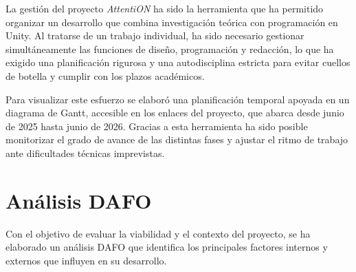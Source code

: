 \documentclass[12pt, a4paper]{report}
\begin{document}
La gestión del proyecto \textit{AttentiON} ha sido la herramienta que ha
permitido organizar un desarrollo que combina investigación teórica con
programación en Unity. Al tratarse de un trabajo individual, ha sido necesario
gestionar simultáneamente las funciones de diseño, programación y redacción,
lo que ha exigido una planificación rigurosa y una autodisciplina estricta
para evitar cuellos de botella y cumplir con los plazos académicos.

Para visualizar este esfuerzo se elaboró una planificación temporal apoyada
en un diagrama de Gantt, accesible en los enlaces del proyecto, que abarca
desde junio de 2025 hasta junio de 2026. Gracias a esta herramienta ha
sido posible monitorizar el grado de avance de las distintas fases y ajustar
el ritmo de trabajo ante dificultades técnicas imprevistas.

\section{Análisis DAFO}

Con el objetivo de evaluar la viabilidad y el contexto del proyecto, se ha
elaborado un análisis DAFO que identifica los principales factores internos
y externos que influyen en su desarrollo.
\end{document}
